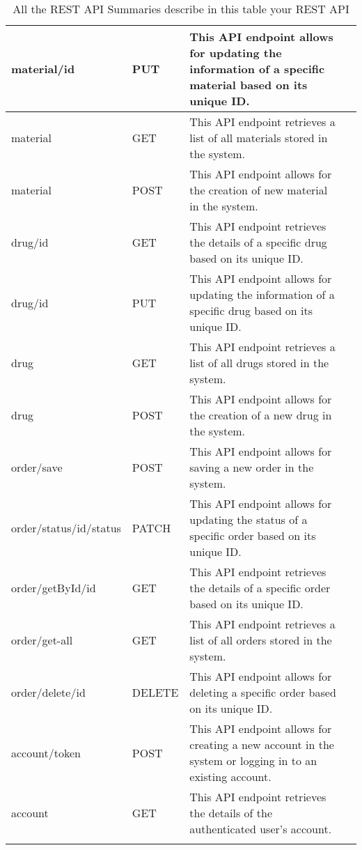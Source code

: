 \begin{longtable}{|p{}|p{} |p{}|p{}|}
material/{id} &
PUT &
This API endpoint allows for updating the information of a specific material based on its unique ID. 
\\\hline
material &
GET &
This API endpoint retrieves a list of all materials stored in the system.
\\\hline
material &
POST &
This API endpoint allows for the creation of new material in the system.
\\\hline
drug/{id} &
GET &
This API endpoint retrieves the details of a specific drug based on its unique ID. 
\\\hline
drug/{id} &
PUT &
This API endpoint allows for updating the information of a specific drug based on its unique ID. 
\\\hline
drug &
GET &
This API endpoint retrieves a list of all drugs stored in the system.
\\\hline
drug &
POST &
This API endpoint allows for the creation of a new drug in the system.
\\\hline
order/save &
POST &
This API endpoint allows for saving a new order in the system.
\\\hline
order/status/{id}/{status} &
PATCH &
This API endpoint allows for updating the status of a specific order based on its unique ID.
\\\hline
order/getById/{id} &
GET &
This API endpoint retrieves the details of a specific order based on its unique ID.
\\\hline
order/get-all &
GET &
This API endpoint retrieves a list of all orders stored in the system.
\\\hline
order/delete/{id} &
DELETE &
This API endpoint allows for deleting a specific order based on its unique ID. 
\\\hline
account/{token} &
POST &
This API endpoint allows for creating a new account in the system or logging in to an existing account.
\\\hline
account &
GET &
This API endpoint retrieves the details of the authenticated user's account.
\\\hline
\caption{All the REST API Summaries describe in this table your REST API}
\label{tab:termGlossary}
\end{longtable}